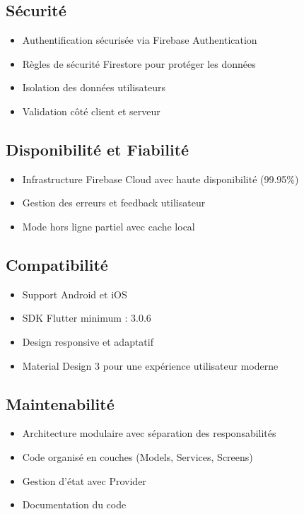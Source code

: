 \documentclass[11pt,a4paper]{article}
\begin{document}
\subsection{Sécurité}
\begin{itemize}[leftmargin=*]
    \item Authentification sécurisée via Firebase Authentication
    \item Règles de sécurité Firestore pour protéger les données
    \item Isolation des données utilisateurs
    \item Validation côté client et serveur
\end{itemize}

\subsection{Disponibilité et Fiabilité}
\begin{itemize}[leftmargin=*]
    \item Infrastructure Firebase Cloud avec haute disponibilité (99.95\%)
    \item Gestion des erreurs et feedback utilisateur
    \item Mode hors ligne partiel avec cache local
\end{itemize}

\subsection{Compatibilité}
\begin{itemize}[leftmargin=*]
    \item Support Android et iOS
    \item SDK Flutter minimum : 3.0.6
    \item Design responsive et adaptatif
    \item Material Design 3 pour une expérience utilisateur moderne
\end{itemize}

\subsection{Maintenabilité}
\begin{itemize}[leftmargin=*]
    \item Architecture modulaire avec séparation des responsabilités
    \item Code organisé en couches (Models, Services, Screens)
    \item Gestion d'état avec Provider
    \item Documentation du code
\end{itemize}
\end{document}
